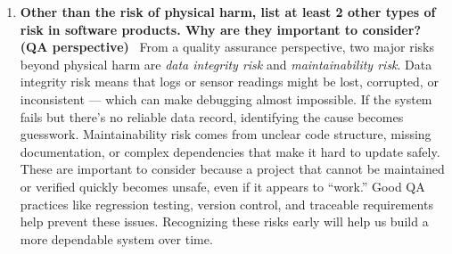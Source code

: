 \documentclass{article}
\begin{document}
\begin{enumerate}
\item \textbf{Other than the risk of physical harm, list at least 2 other types of risk in software products. Why are they important to consider? (QA perspective)} \
From a quality assurance perspective, two major risks beyond physical harm are \textit{data integrity risk} and \textit{maintainability risk}. Data integrity risk means that logs or sensor readings might be lost, corrupted, or inconsistent — which can make debugging almost impossible. If the system fails but there’s no reliable data record, identifying the cause becomes guesswork. Maintainability risk comes from unclear code structure, missing documentation, or complex dependencies that make it hard to update safely. These are important to consider because a project that cannot be maintained or verified quickly becomes unsafe, even if it appears to “work.” Good QA practices like regression testing, version control, and traceable requirements help prevent these issues. Recognizing these risks early will help us build a more dependable system over time.
\end{enumerate}
\end{document}
